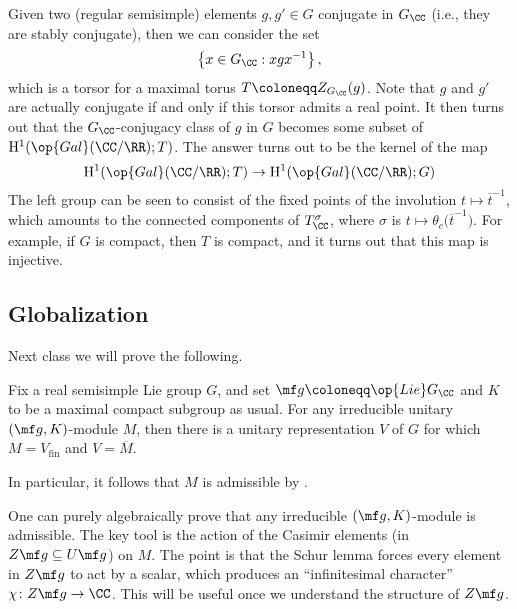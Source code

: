 \documentclass[../notes.tex]{subfiles}
\begin{document}
\begin{remark}
	Given two (regular semisimple) elements $g,g'\in G$ conjugate in $G_\CC$ (i.e., they are stably conjugate), then we can consider the set
	\[\left\{x\in G_\CC:xgx^{-1}\right\},\]
	which is a torsor for a maximal torus $T\coloneqq Z_{G_\CC}(g)$. Note that $g$ and $g'$ are actually conjugate if and only if this torsor admits a real point. It then turns out that the $G_\CC$-conjugacy class of $g$ in $G$ becomes some subset of $\mathrm H^1(\op{Gal}(\CC/\RR);T)$. The answer turns out to be the kernel of the map
	\[\mathrm H^1(\op{Gal}(\CC/\RR);T)\to\mathrm H^1(\op{Gal}(\CC/\RR);G)\]
	The left group can be seen to consist of the fixed points of the involution $t\mapsto\overline t^{-1}$, which amounts to the connected components of $T_\CC^\sigma$, where $\sigma$ is $t\mapsto\theta_c\big(\overline t^{-1}\big)$. For example, if $G$ is compact, then $T$ is compact, and it turns out that this map is injective.
\end{remark}

\subsection{Globalization}
Next class we will prove the following.
\begin{theorem}
	Fix a real semisimple Lie group $G$, and set $\mf g\coloneqq\op{Lie}G_\CC$ and $K$ to be a maximal compact subgroup as usual. For any irreducible unitary $(\mf g,K)$-module $M$, then there is a unitary representation $V$ of $G$ for which $M=V_{\mathrm{fin}}$ and $V=\overline M$.
\end{theorem}
\begin{remark}
	In particular, it follows that $M$ is admissible by .
\end{remark}
\begin{remark}
	One can purely algebraically prove that any irreducible $(\mf g,K)$-module is admissible. The key tool is the action of the Casimir elements (in $Z\mf g\subseteq U\mf g$) on $M$. The point is that the Schur lemma forces every element in $Z\mf g$ to act by a scalar, which produces an ``infinitesimal character'' $\chi\colon Z\mf g\to\CC$. This will be useful once we understand the structure of $Z\mf g$.
\end{remark}
\end{document}

